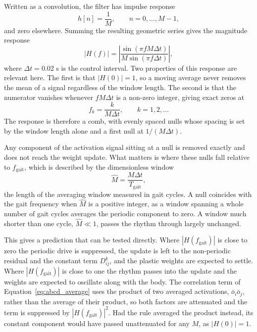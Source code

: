 \documentclass{article} %
\begin{document}
Written as a convolution, the filter has impulse response
\begin{equation}
h[n] = \frac{1}{M}, \qquad n = 0, \dots, M-1,
\label{eq:boxcar-impulse}
\end{equation}
and zero elsewhere. Summing the resulting geometric series gives the magnitude
response
\begin{equation}
|H(f)| = \left| \frac{\sin(\pi f M \Delta t)}
{M \sin(\pi f \Delta t)} \right|,
\label{eq:boxcar-response}
\end{equation}
where $\Delta t = 0.02$ s is the control interval. Two properties of this
response are relevant here. The first is that $|H(0)| = 1$, so a moving average
never removes the mean of a signal regardless of the window length. The second
is that the numerator vanishes whenever $f M \Delta t$ is a non-zero integer,
giving exact zeros at
\begin{equation}
f_k = \frac{k}{M \Delta t}, \qquad k = 1, 2, \dots
\label{eq:boxcar-nulls}
\end{equation}
The response is therefore a comb, with evenly spaced nulls whose spacing is set
by the window length alone and a first null at $1/(M\Delta t)$.

Any component of the activation signal sitting at a null is removed exactly and
does not reach the weight update. What matters is where these nulls fall
relative to $f_{\text{gait}}$, which is described by the dimensionless window
\begin{equation}
\hat{M} = \frac{M \Delta t}{T_{\text{gait}}},
\label{eq:mhat}
\end{equation}
the length of the averaging window measured in gait cycles. A null coincides
with the gait frequency when $\hat{M}$ is a positive integer, as a window
spanning a whole number of gait cycles averages the periodic component to zero.
A window much shorter than one cycle, $\hat{M} \ll 1$, passes the rhythm
through largely unchanged.

This gives a prediction that can be tested directly. Where
$|H(f_{\text{gait}})|$ is close to zero the periodic drive is suppressed, the
update is left to the non-periodic residual and the constant term
$D_{ij}^{k}$, and the plastic weights are expected to settle. Where
$|H(f_{\text{gait}})|$ is close to one the rhythm passes into the update and
the weights are expected to oscillate along with the body. The correlation term
of Equation~\ref{eq:abcd_average} uses the product of two averaged activations,
$\bar{o}_i \bar{o}_j$, rather than the average of their product, so both
factors are attenuated and the term is suppressed by
$|H(f_{\text{gait}})|^2$. Had the rule averaged the product instead, its
constant component would have passed unattenuated for any $M$, as
$|H(0)| = 1$.
\end{document}
